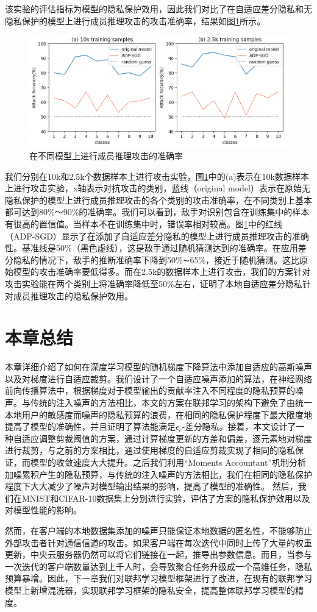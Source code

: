 该实验的评估指标为模型的隐私保护效用，因此我们对比了在自适应差分隐私和无隐私保护的模型上进行成员推理攻击的攻击准确率，结果如图\ref{fig:在不同模型上进行成员推理攻击的准确率}所示。

\begin{figure}[!hbt]
\centering
	\includegraphics[scale=0.5]{fig2/C3/第三章实验三}%
	\caption{在不同模型上进行成员推理攻击的准确率}
	\label{fig:在不同模型上进行成员推理攻击的准确率}	
\end{figure}

我们分别在10k和2.5k个数据样本上进行攻击实验，图\ref{fig:在不同模型上进行成员推理攻击的准确率}中的(a)表示在10k数据样本上进行攻击实验，x轴表示对抗攻击的类别，蓝线（original model）表示在原始无隐私保护的模型上进行成员推理攻击的各个类别的攻击准确率，在不同类别上基本都可达到80\%～90\%的准确率。我们可以看到，敌手对识别包含在训练集中的样本有很高的置信值。当样本不在训练集中时，错误率相对较高。图\ref{fig:在不同模型上进行成员推理攻击的准确率}中的红线（ADP-SGD）显示了在添加了自适应差分隐私的模型上进行成员推理攻击的准确性。基准线是50\%（黑色虚线），这是敌手通过随机猜测达到的准确率。在应用差分隐私的情况下，敌手的推断准确率下降到50\%∼65\%，接近于随机猜测。这比原始模型的攻击准确率要低得多。而在2.5k的数据样本上进行攻击，我们的方案针对攻击实验能在两个类别上将准确率降低至50\%左右，证明了本地自适应差分隐私针对成员推理攻击的隐私保护效用。

\section{本章总结}
本章详细介绍了如何在深度学习模型的随机梯度下降算法中添加自适应的高斯噪声以及对梯度进行自适应裁剪。我们设计了一个自适应噪声添加的算法，在神经网络前向传播算法中，根据梯度对于模型输出的贡献率注入不同程度的隐私预算的噪声。与传统的注入噪声的方法相比，本文的方案在联邦学习的架构下避免了由统一本地用户的敏感度而噪声的隐私预算的浪费，在相同的隐私保护程度下最大限度地提高了模型的准确性，并且证明了算法能满足$\epsilon_{c}$-差分隐私。接着，本文设计了一种自适应调整剪裁阈值的方案，通过计算梯度更新的方差和偏差，逐元素地对梯度进行裁剪，与之前的方案相比，通过使用梯度的自适应剪裁实现了相同的隐私保证，而模型的收敛速度大大提升。之后我们利用“Moments Accountant”机制分析加噪累积产生的隐私预算，与传统的注入噪声的方法相比，我们在相同的隐私保护程度下大大减少了噪声对模型输出结果的影响，提高了模型的准确性。
然后，我们在MNIST和CIFAR-10数据集上分别进行实验，评估了方案的隐私保护效用以及对模型性能的影响。

然而，在客户端的本地数据集添加的噪声只能保证本地数据的匿名性，不能够防止外部攻击者针对通信信道的攻击。如果客户端在每次迭代中同时上传了大量的权重更新，中央云服务器仍然可以将它们链接在一起，推导出参数信息。而且，当参与一次迭代的客户端数量达到上千人时，会导致聚合任务升级成一个高维任务，隐私预算暴增。因此，下一章我们对联邦学习模型框架进行了改进，在现有的联邦学习模型上新增混洗器，实现联邦学习框架的隐私安全，提高整体联邦学习模型的精度。



